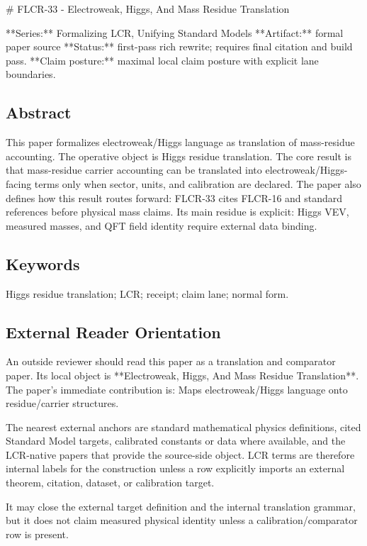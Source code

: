 \documentclass[11pt]{article}
\begin{document}
﻿\# FLCR-33 - Electroweak, Higgs, And Mass Residue Translation

**Series:** Formalizing LCR, Unifying Standard Models
**Artifact:** formal paper source
**Status:** first-pass rich rewrite; requires final citation and build pass.
**Claim posture:** maximal local claim posture with explicit lane boundaries.

\subsection*{Abstract}

This paper formalizes electroweak/Higgs language as translation of mass-residue accounting. The operative object is Higgs residue translation. The core result is that mass-residue carrier accounting can be translated into electroweak/Higgs-facing terms only when sector, units, and calibration are declared. The paper also defines how this result routes forward: FLCR-33 cites FLCR-16 and standard references before physical mass claims. Its main residue is explicit: Higgs VEV, measured masses, and QFT field identity require external data binding.

\subsection*{Keywords}

Higgs residue translation; LCR; receipt; claim lane; normal form.

\subsection*{External Reader Orientation}

An outside reviewer should read this paper as a translation and comparator paper. Its local object is **Electroweak, Higgs, And Mass Residue Translation**. The paper's immediate contribution is: Maps electroweak/Higgs language onto residue/carrier structures.

The nearest external anchors are standard mathematical physics definitions, cited Standard Model targets, calibrated constants or data where available, and the LCR-native papers that provide the source-side object. LCR terms are therefore internal labels for the construction unless a row explicitly imports an external theorem, citation, dataset, or calibration target.

It may close the external target definition and the internal translation grammar, but it does not claim measured physical identity unless a calibration/comparator row is present.
\end{document}
